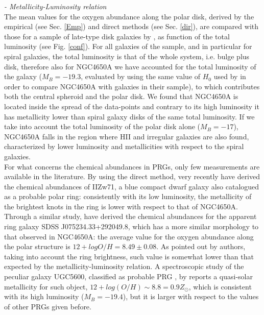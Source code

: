 \documentclass[12pt,preprint]{aastex}
\begin{document}
{\it - Metallicity-Luminosity relation}\\ The mean values for the
oxygen abundance along the polar disk, derived by the empirical (see
Sec. \ref{Emp}) and direct methods (see Sec. \ref{dir}), are compared with
those for a sample of late-type disk galaxies by \citet{Kob99}, as
function of the total luminosity (see Fig. \ref{conf}). For all
galaxies of the sample, and in particular for spiral galaxies, the
total luminosity is that of the whole system, i.e. bulge plus disk,
therefore also for NGC4650A we have accounted for the total luminosity
of the galaxy ($M_B=-19.3$, evaluated by using the same value of $H_{0}$
used by \citet{Kob99} in order to compare NGC4650A with galaxies in their
sample), to which contributes both the central
spheroid and the polar disk. We found that NGC4650A is located inside
the spread of the data-points and contrary to its high luminosity it
has metallicity lower than spiral galaxy disks of the same total
luminosity. If we take into account the total luminosity of the polar
disk alone ($M_B=-17$), NGC4650A falls in the region where HII and
irregular galaxies are also found, characterized by lower luminosity
and metallicities with respect to the spiral galaxies.\\ For what
concerns the chemical abundances in PRGs, only few measurements are
available in the literature. By using the direct method, very recently
\citet{Per09} have derived the chemical abundances of IIZw71, a blue
compact dwarf galaxy also catalogued as a probable polar ring:
consistently with its low luminosity, the metallicity of the brightest
knots in the ring is lower with respect to that of NGC4650A. Through a
similar study, \citet{Bro09} have derived the chemical
abundances for the apparent ring galaxy SDSS J075234.33+292049.8,
which has a more similar morphology to that observed in NGC4650A: the
average value for the oxygen abundance along the polar structure is
$12+logO/H = 8.49 \pm 0.08$. As pointed out by authors, taking into
account the ring brightness, such value is somewhat lower than that
expected by the metallicity-luminosity relation. A spectroscopic study
of the peculiar galaxy UGC5600, classified as probable PRG \citep{Whi90},
by \citet{Sha02} reports a quasi-solar
metallicity for such object, $12+log(O/H) \sim 8.8 = 0.9Z_{\odot}$, which
is consistent with its high luminosity ($M_B=-19.4$), but it is larger
with respect to the values of other PRGs given before.
\end{document}
